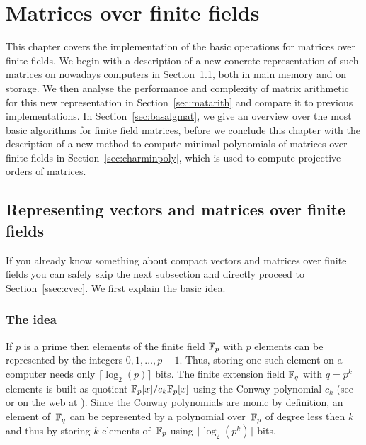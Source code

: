 
\chapter{Matrices over finite fields}

This chapter covers the implementation of the basic operations for matrices 
over finite fields. We begin with a description of a new concrete 
representation of such matrices on nowadays computers in 
Section~\ref{sec:ffematrices}, both in main memory and on storage.
We then analyse the performance and complexity of matrix arithmetic 
for this new representation in Section~\ref{sec:matarith} and compare
it to previous implementations. In Section~\ref{sec:basalgmat}, we give
an overview over the most basic algorithms for finite field matrices,
before we conclude this chapter with the description of a new method
to compute minimal polynomials of matrices over finite fields in
Section~\ref{sec:charminpoly}, which is used to compute projective orders
of matrices.


\section{Representing vectors and matrices over finite fields}
\label{sec:ffematrices}

If you already know something about compact vectors and matrices over 
finite fields you can safely skip the next subsection and directly
proceed to Section~\ref{ssec:cvec}. We first explain the basic idea.

\subsection{The idea}

If $p$ is a prime then elements of the finite field $\mathbb{F}_p$ with $p$
elements can be represented by the integers $0, 1, \ldots, p-1$. Thus,
storing one such element on a computer needs only $\lceil \log_2(p)
\rceil$ bits. The finite extension field  $\mathbb{F}_q$ with $q = p^k$ elements 
is built
as quotient $\mathbb{F}_p[x]/c_k \mathbb{F}_p[x]$ using the Conway polynomial
$c_k$ (see \cite{Nickel} or on the web at \cite{ConwayFL}). Since the
Conway polynomials are monic by definition, an element
of\, $\mathbb{F}_q$ can be represented by a polynomial over\, $\mathbb{F}_p$ of degree 
less then $k$ and thus by storing $k$ elements of\, $\mathbb{F}_p$ using $\lceil
\log_2(p^k) \rceil$ bits.

